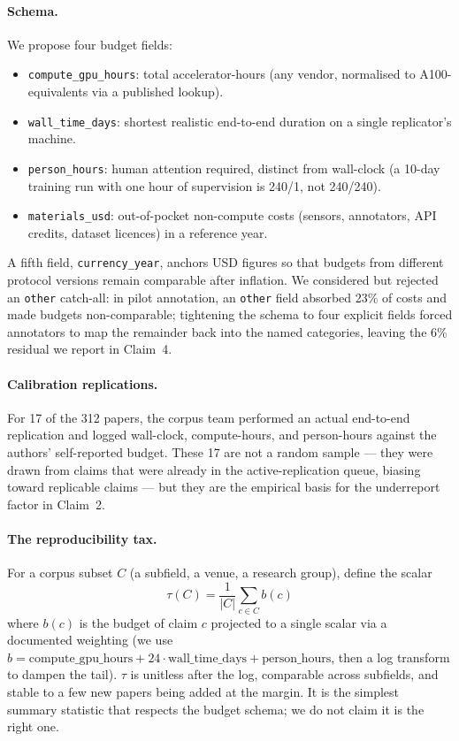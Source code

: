 \documentclass{rrxiv}
\begin{document}
\paragraph{Schema.} We propose four budget fields:
\begin{itemize}[leftmargin=*]
  \item \texttt{compute\_gpu\_hours}: total accelerator-hours (any vendor, normalised to A100-equivalents via a published lookup).
  \item \texttt{wall\_time\_days}: shortest realistic end-to-end duration on a single replicator's machine.
  \item \texttt{person\_hours}: human attention required, distinct from wall-clock (a 10-day training run with one hour of supervision is 240/1, not 240/240).
  \item \texttt{materials\_usd}: out-of-pocket non-compute costs (sensors, annotators, API credits, dataset licences) in a reference year.
\end{itemize}
A fifth field, \texttt{currency\_year}, anchors USD figures so that budgets from different protocol versions remain comparable after inflation. We considered but rejected an \texttt{other} catch-all: in pilot annotation, an \texttt{other} field absorbed 23\% of costs and made budgets non-comparable; tightening the schema to four explicit fields forced annotators to map the remainder back into the named categories, leaving the 6\% residual we report in Claim~4.

\paragraph{Calibration replications.} For 17 of the 312 papers, the corpus team performed an actual end-to-end replication and logged wall-clock, compute-hours, and person-hours against the authors' self-reported budget. These 17 are not a random sample --- they were drawn from claims that were already in the active-replication queue, biasing toward replicable claims --- but they are the empirical basis for the underreport factor in Claim~2.

\paragraph{The reproducibility tax.} For a corpus subset $C$ (a subfield, a venue, a research group), define the scalar
\[
\tau(C) = \frac{1}{|C|} \sum_{c \in C} b(c)
\]
where $b(c)$ is the budget of claim $c$ projected to a single scalar via a documented weighting (we use $b = \text{compute\_gpu\_hours} + 24 \cdot \text{wall\_time\_days} + \text{person\_hours}$, then a log transform to dampen the tail). $\tau$ is unitless after the log, comparable across subfields, and stable to a few new papers being added at the margin. It is the simplest summary statistic that respects the budget schema; we do not claim it is the right one.
\end{document}
